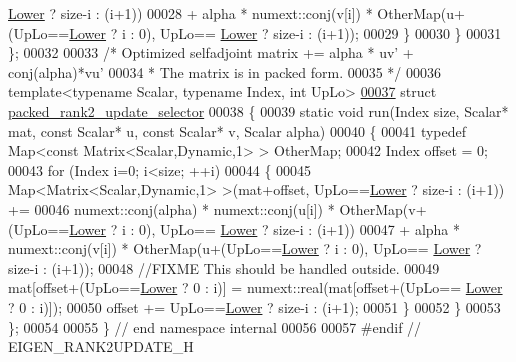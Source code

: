 \begin{DoxyCode}
      \hyperlink{group__enums_gga39e3366ff5554d731e7dc8bb642f83cda891792b8ed394f7607ab16dd716f60e6}{Lower} ? size-i : (i+1))
00028                 + alpha * numext::conj(v[i]) * OtherMap(u+(UpLo==\hyperlink{group__enums_gga39e3366ff5554d731e7dc8bb642f83cda891792b8ed394f7607ab16dd716f60e6}{Lower} ? i : 0), UpLo==
      \hyperlink{group__enums_gga39e3366ff5554d731e7dc8bb642f83cda891792b8ed394f7607ab16dd716f60e6}{Lower} ? size-i : (i+1));
00029     \}
00030   \}
00031 \};
00032 
00033 \textcolor{comment}{/* Optimized selfadjoint matrix += alpha * uv' + conj(alpha)*vu'}
00034 \textcolor{comment}{ * The matrix is in packed form.}
00035 \textcolor{comment}{ */}
00036 \textcolor{keyword}{template}<\textcolor{keyword}{typename} Scalar, \textcolor{keyword}{typename} Index, \textcolor{keywordtype}{int} UpLo>
\hyperlink{structinternal_1_1packed__rank2__update__selector}{00037} \textcolor{keyword}{struct }\hyperlink{structinternal_1_1packed__rank2__update__selector}{packed\_rank2\_update\_selector}
00038 \{
00039   \textcolor{keyword}{static} \textcolor{keywordtype}{void} run(Index size, Scalar* mat, \textcolor{keyword}{const} Scalar* u, \textcolor{keyword}{const} Scalar* v, Scalar alpha)
00040   \{
00041     \textcolor{keyword}{typedef} Map<const Matrix<Scalar,Dynamic,1> > OtherMap;
00042     Index offset = 0;
00043     \textcolor{keywordflow}{for} (Index i=0; i<size; ++i)
00044     \{
00045       Map<Matrix<Scalar,Dynamic,1> >(mat+offset, UpLo==\hyperlink{group__enums_gga39e3366ff5554d731e7dc8bb642f83cda891792b8ed394f7607ab16dd716f60e6}{Lower} ? size-i : (i+1)) +=
00046       numext::conj(alpha) * numext::conj(u[i]) * OtherMap(v+(UpLo==\hyperlink{group__enums_gga39e3366ff5554d731e7dc8bb642f83cda891792b8ed394f7607ab16dd716f60e6}{Lower} ? i : 0), UpLo==
      \hyperlink{group__enums_gga39e3366ff5554d731e7dc8bb642f83cda891792b8ed394f7607ab16dd716f60e6}{Lower} ? size-i : (i+1))
00047                 + alpha * numext::conj(v[i]) * OtherMap(u+(UpLo==\hyperlink{group__enums_gga39e3366ff5554d731e7dc8bb642f83cda891792b8ed394f7607ab16dd716f60e6}{Lower} ? i : 0), UpLo==
      \hyperlink{group__enums_gga39e3366ff5554d731e7dc8bb642f83cda891792b8ed394f7607ab16dd716f60e6}{Lower} ? size-i : (i+1));
00048       \textcolor{comment}{//FIXME This should be handled outside.}
00049       mat[offset+(UpLo==\hyperlink{group__enums_gga39e3366ff5554d731e7dc8bb642f83cda891792b8ed394f7607ab16dd716f60e6}{Lower} ? 0 : i)] = numext::real(mat[offset+(UpLo==
      \hyperlink{group__enums_gga39e3366ff5554d731e7dc8bb642f83cda891792b8ed394f7607ab16dd716f60e6}{Lower} ? 0 : i)]);
00050       offset += UpLo==\hyperlink{group__enums_gga39e3366ff5554d731e7dc8bb642f83cda891792b8ed394f7607ab16dd716f60e6}{Lower} ? size-i : (i+1);
00051     \}
00052   \}
00053 \};
00054 
00055 \} \textcolor{comment}{// end namespace internal}
00056 
00057 \textcolor{preprocessor}{#endif // EIGEN\_RANK2UPDATE\_H}
\end{DoxyCode}
